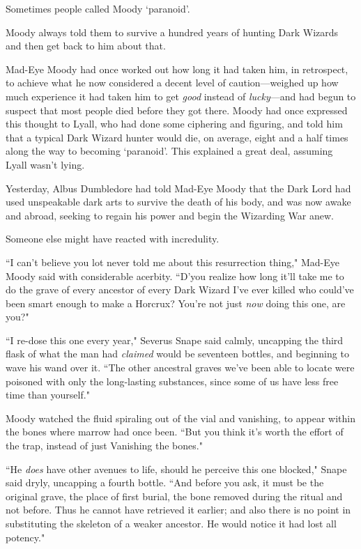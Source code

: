 Sometimes people called Moody `paranoid'.

Moody always told them to survive a hundred years of hunting Dark Wizards and then get back to him about that.

Mad-Eye Moody had once worked out how long it had taken him, in retrospect, to achieve what he now considered a decent level of caution—weighed up how much experience it had taken him to get \emph{good} instead of \emph{lucky}—and had begun to suspect that most people died before they got there. Moody had once expressed this thought to Lyall, who had done some ciphering and figuring, and told him that a typical Dark Wizard hunter would die, on average, eight and a half times along the way to becoming `paranoid'. This explained a great deal, assuming Lyall wasn't lying.

Yesterday, Albus Dumbledore had told Mad-Eye Moody that the Dark Lord had used unspeakable dark arts to survive the death of his body, and was now awake and abroad, seeking to regain his power and begin the Wizarding War anew.

Someone else might have reacted with incredulity.

``I can't believe you lot never told me about this resurrection thing," Mad-Eye Moody said with considerable acerbity. ``D'you realize how long it'll take me to do the grave of every ancestor of every Dark Wizard I've ever killed who could've been smart enough to make a Horcrux? You're not just \emph{now} doing this one, are you?"

``I re-dose this one every year," Severus Snape said calmly, uncapping the third flask of what the man had \emph{claimed} would be seventeen bottles, and beginning to wave his wand over it. ``The other ancestral graves we've been able to locate were poisoned with only the long-lasting substances, since some of us have less free time than yourself."

Moody watched the fluid spiraling out of the vial and vanishing, to appear within the bones where marrow had once been. ``But you think it's worth the effort of the trap, instead of just Vanishing the bones."

``He \emph{does} have other avenues to life, should he perceive this one blocked," Snape said dryly, uncapping a fourth bottle. ``And before you ask, it must be the original grave, the place of first burial, the bone removed during the ritual and not before. Thus he cannot have retrieved it earlier; and also there is no point in substituting the skeleton of a weaker ancestor. He would notice it had lost all potency."


